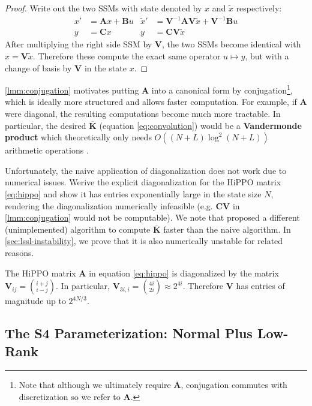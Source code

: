 \begin{proof}
  Write out the two SSMs with state denoted by \( x \) and \( \tilde{x} \) respectively:
  \begin{align*}
    x' &= \bm{A}x + \bm{B}u & \tilde{x}' &= \bm{V}^{-1}\bm{A}\bm{V}\tilde{x} + \bm{V}^{-1}\bm{B}u \\
    y &= \bm{C}x & y &= \bm{C}\bm{V}\tilde{x}
  \end{align*}
  After multiplying the right side SSM by \( \bm{V} \), the two SSMs become identical with \( x = \bm{V}\tilde{x} \).
  Therefore these compute the exact same operator \( u \mapsto y \), but with a change of basis by \( \bm{V} \) in the state \( x \).
\end{proof}

\ref{lmm:conjugation} motivates putting \( \bm{A} \) into a canonical form by conjugation\footnote{Note that although we ultimately require \( \bm{\overline{A}} \), conjugation commutes with discretization so we refer to \( \bm{A} \).}, which is ideally more structured and allows faster computation. For example, if \( \bm{A} \) were diagonal, the resulting computations become much more tractable. In particular, the desired \( \bm{\overline{K}} \) (equation \eqref{eq:convolution}) would be a \textbf{Vandermonde product} which theoretically only needs \( O((N+L)\log^2(N+L)) \) arithmetic operations \citep{pan2001structured}.

Unfortunately, the naive application of diagonalization does not work due to numerical issues. Werive the explicit diagonalization for the HiPPO matrix \eqref{eq:hippo} and show it has entries exponentially large in the state size \( N \), rendering the diagonalization numerically infeasible (e.g. \( \bm{C}\bm{V} \) in \ref{lmm:conjugation} would not be computable). We note that \citet{gu2021lssl} proposed a different (unimplemented) algorithm to compute \( \bm{\overline{K}} \) faster than the naive algorithm. In \ref{sec:lssl-instability}, we prove that it is also numerically unstable for related reasons.

\begin{lemma}
  \label{lmm:hippo-diagonalization}
  The HiPPO matrix \( \bm{A} \) in equation \eqref{eq:hippo} is diagonalized by the matrix \( \bm{V}_{ij} = \binom{i+j}{i-j} \).
  In particular, \( \bm{V}_{3i,i} = \binom{4i}{2i} \approx 2^{4i} \).
  Therefore \( \bm{V} \) has entries of magnitude up to \( 2^{4N / 3} \).
\end{lemma}

\subsection{The S4 Parameterization: Normal Plus Low-Rank}
\label{sec:s4-overview}

